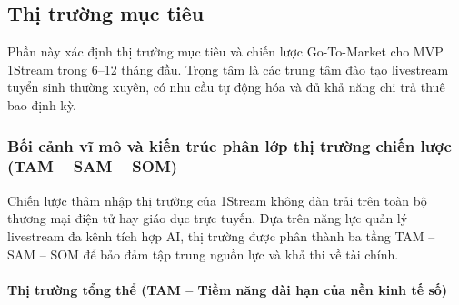%
%

\subsection{Thị trường mục tiêu}

Phần này xác định thị trường mục tiêu và chiến lược Go-To-Market cho MVP 1Stream trong 6--12 tháng đầu. Trọng tâm là các trung tâm đào tạo livestream tuyển sinh thường xuyên, có nhu cầu tự động hóa và đủ khả năng chi trả thuê bao định kỳ.


\subsubsection{Bối cảnh vĩ mô và kiến trúc phân lớp thị trường chiến lược (TAM -- SAM -- SOM)}

Chiến lược thâm nhập thị trường của 1Stream không dàn trải trên toàn bộ thương mại điện tử hay giáo dục trực tuyến. Dựa trên năng lực quản lý livestream đa kênh tích hợp AI, thị trường được phân thành ba tầng TAM -- SAM -- SOM để bảo đảm tập trung nguồn lực và khả thi về tài chính.

\paragraph{Thị trường tổng thể (TAM -- Tiềm năng dài hạn của nền kinh tế số)}

